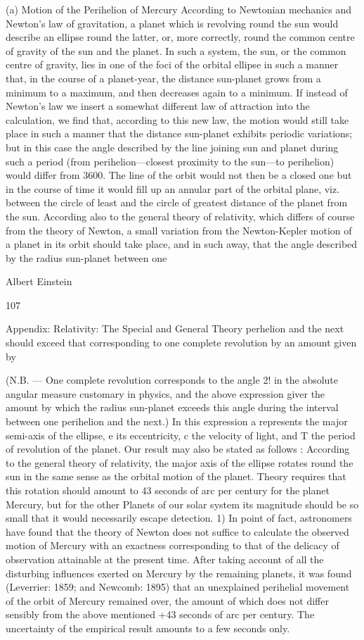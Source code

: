 \documentclass{article}
\begin{document}
(a) Motion of the Perihelion of Mercury
According to Newtonian mechanics and Newton's law of gravitation, a planet which is
revolving round the sun would describe an ellipse round the latter, or, more correctly, round
the common centre of gravity of the sun and the planet. In such a system, the sun, or the
common centre of gravity, lies in one of the foci of the orbital ellipse in such a manner that,
in the course of a planet-year, the distance sun-planet grows from a minimum to a
maximum, and then decreases again to a minimum. If instead of Newton's law we insert a
somewhat different law of attraction into the calculation, we find that, according to this new
law, the motion would still take place in such a manner that the distance sun-planet exhibits
periodic variations; but in this case the angle described by the line joining sun and planet
during such a period (from perihelion—closest proximity to the sun—to perihelion) would
differ from 3600. The line of the orbit would not then be a closed one but in the course of
time it would fill up an annular part of the orbital plane, viz. between the circle of least and
the circle of greatest distance of the planet from the sun.
According also to the general theory of relativity, which differs of course from the theory
of Newton, a small variation from the Newton-Kepler motion of a planet in its orbit should
take place, and in such away, that the angle described by the radius sun-planet between one

Albert Einstein

107

Appendix: Relativity: The Special and General Theory
perhelion and the next should exceed that corresponding to one complete revolution by an
amount given by

(N.B. — One complete revolution corresponds to the angle 2! in the absolute angular
measure customary in physics, and the above expression giver the amount by which the
radius sun-planet exceeds this angle during the interval between one perihelion and the
next.) In this expression a represents the major semi-axis of the ellipse, e its eccentricity, c
the velocity of light, and T the period of revolution of the planet. Our result may also be
stated as follows : According to the general theory of relativity, the major axis of the ellipse
rotates round the sun in the same sense as the orbital motion of the planet. Theory requires
that this rotation should amount to 43 seconds of arc per century for the planet Mercury, but
for the other Planets of our solar system its magnitude should be so small that it would
necessarily escape detection. 1)
In point of fact, astronomers have found that the theory of Newton does not suffice to
calculate the observed motion of Mercury with an exactness corresponding to that of the
delicacy of observation attainable at the present time. After taking account of all the
disturbing influences exerted on Mercury by the remaining planets, it was found (Leverrier:
1859; and Newcomb: 1895) that an unexplained perihelial movement of the orbit of
Mercury remained over, the amount of which does not differ sensibly from the above
mentioned +43 seconds of arc per century. The uncertainty of the empirical result amounts
to a few seconds only.
\end{document}
